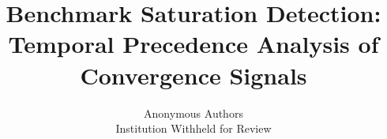 \documentclass{article}
\title{Benchmark Saturation Detection: \\
Temporal Precedence Analysis of Convergence Signals}
\author{
Anonymous Authors \\
Institution Withheld for Review
}
\begin{document}
\maketitle

\begin{abstract}

\end{abstract}











\end{document}
